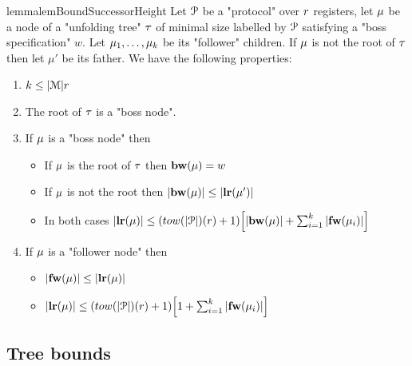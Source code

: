 \begin{restatable}{lemma}{lemBoundSuccessorHeight}
	\label{lem:bound-successor-height}
	Let $\mathcal{P}$ be a "protocol" over $r$ registers, let $\mu$ be a node of a "unfolding tree" $\tau$ of minimal size labelled by $\mathcal{P}$ satisfying a "boss specification" $w$.
	Let $\mu_1, \ldots, \mu_k$ be its "follower" children. If $\mu$ is not the root of $\tau$ then let $\mu'$ be its father.
	We have the following properties:
	
	\begin{enumerate}
		\item $k \leq |\mathcal{M}|r$ 
		
		\item The root of $\tau$ is a "boss node".
				
		\item  If $\mu$ is a "boss node" then 
		\begin{itemize}
			\item If $\mu$ is the root of $\tau$ then $\mathbf{bw}(\mu) = w$
			
			\item If $\mu$ is not the root then $|\mathbf{bw}(\mu)| \leq |\mathbf{lr}(\mu')|$
			
			\item In both cases $\size{\localrunlabel{\node}} \leq (\towerfun(\size{\prot})(r) + 1)\Big[ \size{\bosslabel{\node}} + \sum_{i=1}^k \size{\followlabelword{\node_i}} \Big]$
		\end{itemize}
	
		\item If $\mu$ is a "follower node" then 
		\begin{itemize}			
			\item $|\mathbf{fw}(\mu)| \leq |\mathbf{lr}(\mu)|$
			
			\item $\size{\localrunlabel{\node}} \leq (\towerfun(\size{\prot})(r) +1)\Big[ 1 + \sum_{i=1}^k \size{\followlabelword{\node_i}} \Big]$
			
		\end{itemize}
	\end{enumerate}
\end{restatable}


\subsection{Tree bounds}
\label{sec:tree-bounds}

